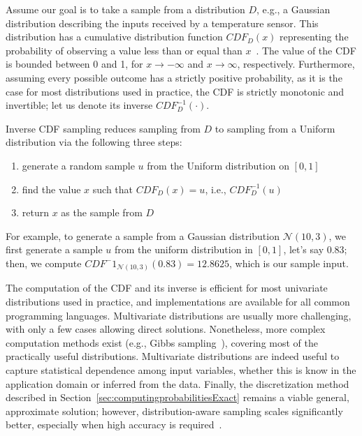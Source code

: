 Assume our goal is to take a sample from a distribution $D$, e.g., a Gaussian distribution describing the inputs received by a temperature sensor. This distribution has a cumulative distribution function $CDF_D(x)$ representing the probability of observing a value less than or equal than $x$~\cite{pestman1998mathematical}. The value of the CDF is bounded between 0 and 1, for $x\to -\infty$ and $x \to \infty$, respectively. Furthermore, assuming every possible outcome has a strictly positive probability, as it is the case for most distributions used in practice, the CDF is strictly monotonic and invertible; let us denote its inverse $CDF_D^{-1}(\cdot)$. 

Inverse CDF sampling reduces sampling from $D$ to sampling from a Uniform distribution via the following three steps:

\begin{enumerate}
	\item generate a random sample $u$ from the Uniform distribution on $[0,1]$
	\item find the value $x$ such that $CDF_D(x)=u$, i.e., $CDF_D^{-1}(u)$
	\item return $x$ as the sample from $D$
\end{enumerate}

For example, to generate a sample from a Gaussian distribution $\mathcal{N}(10, 3)$, we first generate a sample $u$ from the uniform distribution in $[0,1]$, let's say 0.83; then, we compute $CDF^-1_{\mathcal{N}(10,3)}(0.83)=12.8625$, which is our sample input.

The computation of the CDF and its inverse is efficient for most univariate distributions used in practice, and implementations are available for all common programming languages. Multivariate distributions are usually more challenging, with only a few cases allowing direct solutions. Nonetheless, more complex computation methods exist (e.g., Gibbs sampling~\cite{Robert2005MCBook}), covering most of the practically useful distributions. Multivariate distributions are indeed useful to capture statistical dependence among input variables, whether this is know in the application domain or inferred from the data. Finally, the discretization method described in Section~\ref{sec:computingprobabilitiesExact} remains a viable general, approximate solution; however, distribution-aware sampling scales significantly better, especially when high accuracy is required~\cite{2015-fse-qcoral}.



